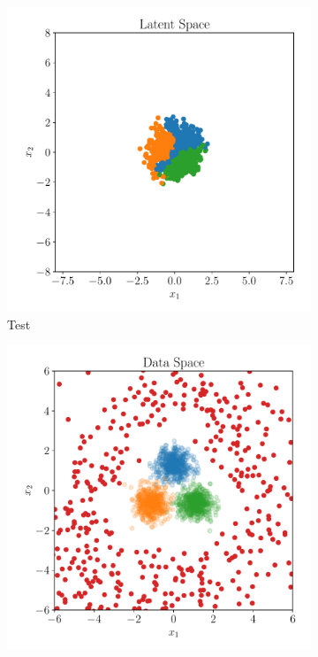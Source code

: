 \begin{figure}[htpb]
\begin{subfigure}[]{0.4\textwidth}
    \includegraphics[width=\linewidth]{figures/toy_example/gaussian_mixture/latent_space.pdf}
        \caption{Test}
        \label{fig:gmm_latent_space}
    \end{subfigure}
    \begin{subfigure}[]{0.4\textwidth}
        \centering
    \includegraphics[width=\linewidth]{figures/toy_example/gaussian_mixture/gumbel_samples.pdf}

\end{subfigure}
\end{figure}
